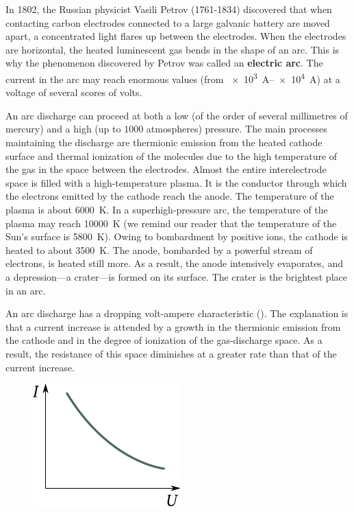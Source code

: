 In 1802, the Russian physicist Vasili Petrov (1761-1834) discovered that when contacting carbon electrodes connected to a large galvanic battery are moved apart, a concentrated light flares up between
the electrodes.
When the electrodes are horizontal, the heated luminescent gas bends in the shape of an arc.
This is why the phenomenon discovered by Petrov was called an \textbf{electric arc}.
The current in the arc may reach enormous values (from \SIrange{e3}{e4}{\ampere}) at a voltage
of several scores of volts.

An arc discharge can proceed at both a low (of the order of several millimetres of mercury) and a high (up to $1000$ atmospheres) pressure.
The main processes maintaining the discharge are thermionic emission from the heated cathode surface and thermal ionization of the molecules due to the high temperature of the gas in the space between the electrodes.
Almost the entire interelectrode space is filled with a high-temperature plasma.
It is the conductor through which the electrons emitted by the cathode reach the anode.
The temperature of the plasma is about \SI{6000}{\kelvin}.
In a superhigh-pressure arc, the temperature of the plasma may reach \SI{10000}{\kelvin} (we remind our reader that the temperature of the Sun's surface is \SI{5800}{\kelvin}).
Owing to bombardment by positive ions, the cathode is heated to about \SI{3500}{\kelvin}.
The anode, bombarded by a powerful stream of electrons, is heated still more.
As a result, the anode intensively evaporates, and a depression---a crater---is formed on its surface.
The crater is the brightest place in an arc.

An arc discharge has a dropping volt-ampere characteristic ().
The explanation is that a current increase is attended by a growth in the thermionic emission from the cathode and in the degree of ionization of the gas-discharge space.
As a result, the resistance of this space diminishes at a greater rate than that of the current increase.

\begin{figure}[t]
	\begin{center}
		\includegraphics[scale=1]{figures/ch_12/fig_12_9.pdf}
		\caption[]{}
		\label{fig:12_9}
	\end{center}
	\vspace{-0.8cm}
\end{figure}


